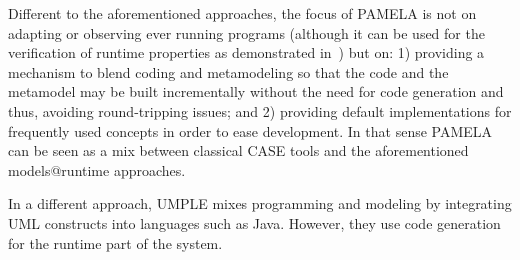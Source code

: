 Different to the aforementioned approaches, the focus of PAMELA is not on adapting or observing ever running programs (although it can be used for the verification of runtime properties as demonstrated in~\cite{silva20}) but on: 1) providing a mechanism to blend coding and metamodeling so that the code and the metamodel may be built incrementally without the need for code generation and thus, avoiding round-tripping issues; and 2) providing default implementations for frequently used concepts in order to ease development. In that sense PAMELA can be seen as a mix between classical CASE tools and the aforementioned models@runtime approaches.

In a different approach, UMPLE\cite{lethbridge2016merging} mixes programming and modeling by integrating UML
constructs into languages such as Java. However, they use code generation for
the runtime part of the system.
